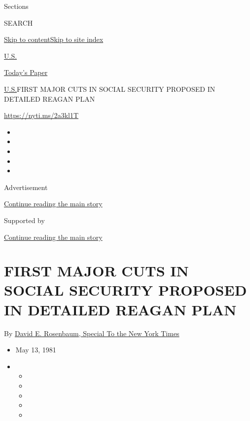 Sections

SEARCH

\protect\hyperlink{site-content}{Skip to
content}\protect\hyperlink{site-index}{Skip to site index}

\href{https://www.nytimes3xbfgragh.onion/section/us}{U.S.}

\href{https://myaccount.nytimes3xbfgragh.onion/auth/login?response_type=cookie\&client_id=vi}{}

\href{https://www.nytimes3xbfgragh.onion/section/todayspaper}{Today's
Paper}

\href{/section/us}{U.S.}\textbar{}FIRST MAJOR CUTS IN SOCIAL SECURITY
PROPOSED IN DETAILED REAGAN PLAN

\url{https://nyti.ms/2a3kl1T}

\begin{itemize}
\item
\item
\item
\item
\item
\end{itemize}

Advertisement

\protect\hyperlink{after-top}{Continue reading the main story}

Supported by

\protect\hyperlink{after-sponsor}{Continue reading the main story}

\hypertarget{first-major-cuts-in-social-security-proposed-in-detailed-reagan-plan}{%
\section{FIRST MAJOR CUTS IN SOCIAL SECURITY PROPOSED IN DETAILED REAGAN
PLAN}\label{first-major-cuts-in-social-security-proposed-in-detailed-reagan-plan}}

By \href{https://www.nytimes3xbfgragh.onion/by/david-e-rosenbaum}{David
E. Rosenbaum, Special To the New York Times}

\begin{itemize}
\item
  May 13, 1981
\item
  \begin{itemize}
  \item
  \item
  \item
  \item
  \item
  \end{itemize}
\end{itemize}


